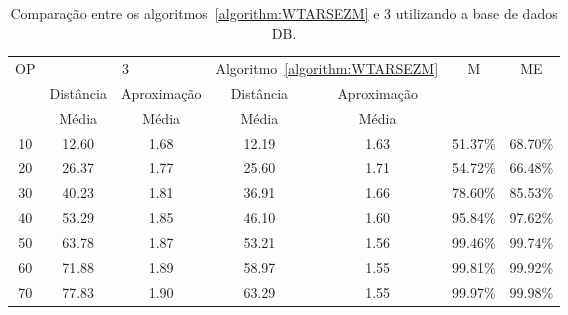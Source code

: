 \begin{table}[!htb]
  \caption{Comparação entre os algoritmos~\ref{algorithm:WTARSEZM} e 3\SbIRT{} utilizando a base de dados DB\textsubscript{\SbIRT}.}
  \label{table:ZZECIDRQ}
  \centering
  \begin{tabular}{|c|c|c|c|c|c|c|}
  \hline
          \multirow{3}{*}{OP} &                   \multicolumn{2}{c|}{3\SbIRT{}}  & \multicolumn{2}{c|}{Algoritmo~\ref{algorithm:WTARSEZM}} &      \multirow{3}{*}{M} &     \multirow{3}{*}{ME} \\ \cline{2-5}
                              &               Distância &             Aproximação &                     Distância &             Aproximação &                         &                         \\
                              &                   Média &                   Média &                         Média &                   Média &                         &                         \\ \hline
  10                          &                   12.60 &                    1.68 &                         12.19 &                    1.63 &                 51.37\% &                 68.70\% \\ \hline
  20                          &                   26.37 &                    1.77 &                         25.60 &                    1.71 &                 54.72\% &                 66.48\% \\ \hline
  30                          &                   40.23 &                    1.81 &                         36.91 &                    1.66 &                 78.60\% &                 85.53\% \\ \hline
  40                          &                   53.29 &                    1.85 &                         46.10 &                    1.60 &                 95.84\% &                 97.62\% \\ \hline
  50                          &                   63.78 &                    1.87 &                         53.21 &                    1.56 &                 99.46\% &                 99.74\% \\ \hline
  60                          &                   71.88 &                    1.89 &                         58.97 &                    1.55 &                 99.81\% &                 99.92\% \\ \hline
  70                          &                   77.83 &                    1.90 &                         63.29 &                    1.55 &                 99.97\% &                 99.98\% \\ \hline

\end{tabular}
\end{table}
